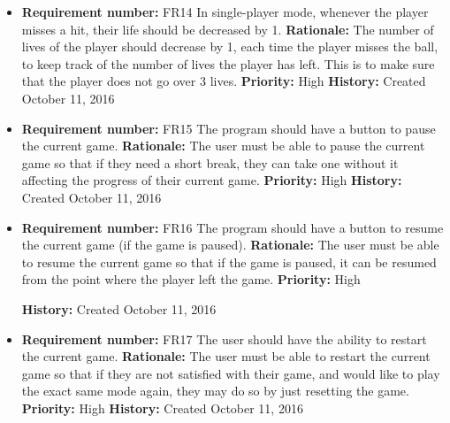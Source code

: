 \documentclass[12pt,letterpaper]{article}
\begin{document}
\begin{reqbox}
	\begin{itemize}
		\item \textbf{Requirement number: }FR14
		In single-player mode, whenever the player misses a hit, their life should be decreased by 1.
		\textbf{Rationale: }The number of lives of the player should decrease by 1, each time the player misses the ball, to keep track of the number of lives the player has left. This is to make sure that the player does not go over 3 lives.
		\textbf{Priority: }High
		\textbf{History: }Created October 11, 2016
	\end{itemize}
\end{reqbox}
\begin{reqbox}
	\begin{itemize}
		\item \textbf{Requirement number: }FR15
		The program should have a button to pause the current game.
		\textbf{Rationale: }The user must be able to pause the current game so that if they need a short break, they can take one without it affecting the progress of their current game.
		\textbf{Priority: }High
		\textbf{History: }Created October 11, 2016
	\end{itemize}
\end{reqbox}
\begin{reqbox}
	\begin{itemize}
		\item \textbf{Requirement number: }FR16
		The program should have a button to resume the current game (if the game is paused).
		\textbf{Rationale: }The user must be able to resume the current game so that if the game is paused, it can be resumed from the point where the player left the game.
		\textbf{Priority: }High
	
		\textbf{History: }Created October 11, 2016
	\end{itemize}
\end{reqbox}
\begin{reqbox}
	\begin{itemize}
		\item \textbf{Requirement number: }FR17
		The user should have the ability to restart the current game.
		\textbf{Rationale: }The user must be able to restart the current game so that if they are not satisfied with their game, and would like to play the exact same mode again, they may do so by just resetting the game.
		\textbf{Priority: }High
		\textbf{History: }Created October 11, 2016
	\end{itemize}
\end{reqbox}
\end{document}
